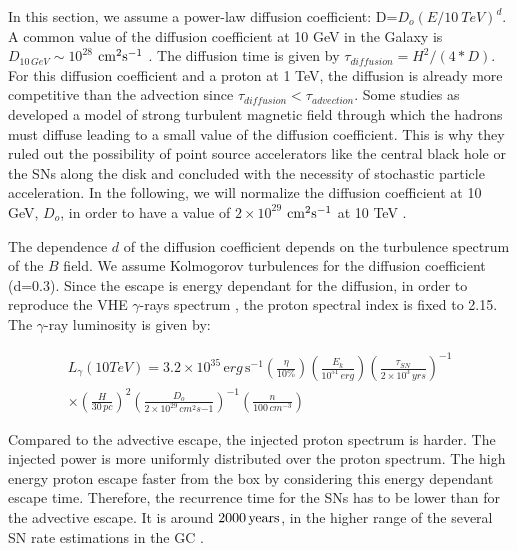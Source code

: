 \documentclass[a4paper,fleqn,usenatbib]{mnras}
\begin{document}
In this section, we assume a power-law diffusion coefficient: D=$D_o {\left(E/10 \ TeV\right)}^{d}$.
A common value of the diffusion coefficient at 10 GeV in the Galaxy is $D_{10 \, GeV} \sim 10^{28}$ $\rm cm^2s^{-1}$ \citep{1990acr..book.....B}. The diffusion time is given by $\tau_{diffusion}=H^2/(4*D)$. For this diffusion coefficient and a proton at 1 TeV, the diffusion is already more competitive than the advection since $\tau_{diffusion} < \tau_{advection}$. Some studies as \citet{2008MNRAS.387..987W} developed a model of strong turbulent magnetic field through which the hadrons must diffuse leading to a small value of the diffusion coefficient. This is why they ruled out the possibility of point source accelerators like the central black hole or the SNs along the disk and concluded with the necessity of stochastic particle acceleration. In the following, we will normalize the diffusion coefficient at 10 GeV, $D_o$, in order to have a value of $2\times 10^{29}$ $\rm cm^2s^{-1}$ at 10 TeV .
 
 
The dependence $d$ of the diffusion coefficient depends on the turbulence spectrum of the $B$ field. We assume Kolmogorov turbulences for the diffusion coefficient (d=0.3). Since the escape is energy dependant for the diffusion, in order to reproduce the VHE $\gamma$-rays spectrum \citep{2006Natur.439..695A}, the proton spectral index is fixed to 2.15. 
The $\gamma$-ray luminosity is given by:
\begin{center}
\begin{multline}
L_{\gamma} (10 TeV)=3.2\times 10^{35} \, \mathrm erg \, \mathrm s^{-1} \left(\frac{\eta}{10\%}\right) \left(\frac{E_{k}}{10^{51} \, erg}\right) {\left(\frac{\tau_{SN}}{2\times 10^{3} \, yrs}\right)}^{-1}  \\ \times {\left(\frac{H}{30 \, pc}\right)}^2 
{\left(\frac{D_o}{2 \times 10^{29} \, cm^2s{-1}} \right)}^{-1} \left(\frac{n}{100 \, cm^{-3}}\right)
\label{steadystate5}
\end{multline}
\end{center} 



Compared to the advective escape, the injected proton spectrum is harder. The injected power is more uniformly distributed over the proton spectrum. The high energy proton escape faster from the box by considering this energy dependant escape time. Therefore, the recurrence time for the SNs has to be lower than for the advective escape. It is around $2000 \, \rm years$, in the higher range of the several SN rate estimations in the GC \citep{2011MNRAS.413..763C, 2015MNRAS.453..172P}. 
\end{document}
